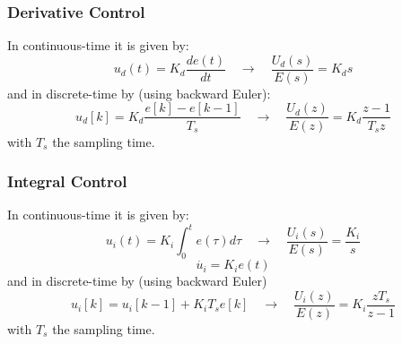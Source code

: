 \begin{frame}
	\frametitle{Derivative Control}
	In continuous-time it is given by:
	\begin{equation*}
		u_d(t) = K_d \frac{de(t)}{dt} \quad \rightarrow \quad \frac{U_d(s)}{E(s)} = K_d s 
	\end{equation*}
	and in discrete-time by (using backward Euler):
	\begin{equation*}
	u_d[k] = K_d \frac{ e[k] - e[k-1]}{T_s} \quad \rightarrow \quad \frac{U_d(z)}{E(z)} = K_d \frac{z - 1}{T_sz}
	\end{equation*}
	with $T_s$ the sampling time.
\end{frame}

\begin{frame}
	\frametitle{Integral Control}
	In continuous-time it is given by:
	\begin{equation*}
		u_i(t) = K_i \int_0^t e(\tau)d\tau \quad \rightarrow \quad \frac{U_i(s)}{E(s)} = \frac{K_i}{s} 
	\end{equation*}
	\begin{equation*}
		\dot{u_i} = K_i e(t)
	\end{equation*}
	and in discrete-time by (using backward Euler)
	\begin{equation*}
	u_i[k] = u_i[k-1] + K_i T_s e[k] \quad \rightarrow \quad \frac{U_i(z)}{E(z)} = K_i \frac{z T_s}{z - 1}
	\end{equation*}
	with $T_s$ the sampling time.
\end{frame}

